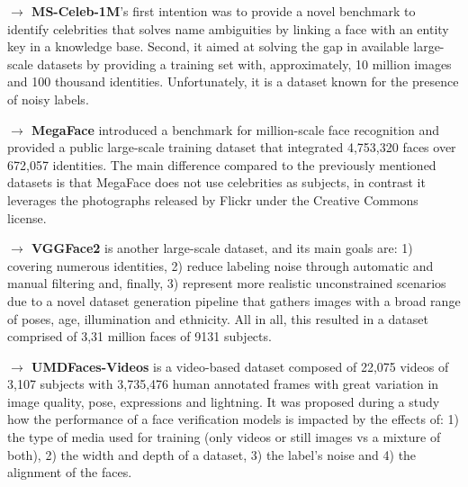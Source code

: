 \documentclass[class=report, crop=false, a4paper, 12pt]{standalone}
\begin{document}



\vspace{0.7\baselineskip}
\noindent\textbf{$\rightarrow$ MS-Celeb-1M}'s \autocite{guoMSCeleb1MDatasetBenchmark2016} first intention was to provide a novel benchmark to identify celebrities that solves name ambiguities by linking a face with an entity key in a knowledge base. Second, it aimed at solving the gap in available large-scale datasets by providing a training set with, approximately, 10 million images and 100 thousand identities. Unfortunately, it is a dataset known for the presence of noisy labels. 


\vspace{0.7\baselineskip}
\noindent\textbf{$\rightarrow$ MegaFace} \autocite{nechLevelPlayingField2017} introduced a benchmark for million-scale face recognition and provided a public large-scale training dataset that integrated 4,753,320 faces over 672,057 identities. The main difference compared to the previously mentioned datasets is that MegaFace does not use celebrities as subjects, in contrast it leverages the photographs released by Flickr under the Creative Commons license. 

\vspace{0.7\baselineskip}
\noindent\textbf{$\rightarrow$ VGGFace2} \autocite{caoVGGFace2DatasetRecognising2018} is another large-scale dataset, and its main goals are: 1) covering numerous identities, 2) reduce labeling noise through automatic and manual filtering and, finally, 3) represent more realistic unconstrained scenarios due to a novel dataset generation pipeline that gathers images with a broad range of poses, age, illumination and ethnicity. All in all, this resulted in a dataset comprised of 3,31 million faces of 9131 subjects.

\vspace{0.7\baselineskip}
\noindent\textbf{$\rightarrow$ UMDFaces-Videos} \autocite{bansalDonTsCNNbased2017} is a video-based dataset composed of 22,075 videos of 3,107 subjects with 3,735,476 human annotated frames with great variation in image quality, pose, expressions and lightning. It was proposed during a study how the performance of a face verification models is impacted by the effects of: 1) the type of media used for training (only videos or still images vs a mixture of both), 2) the width and depth of a dataset, 3) the label's noise and 4) the alignment of the faces.
\end{document}
